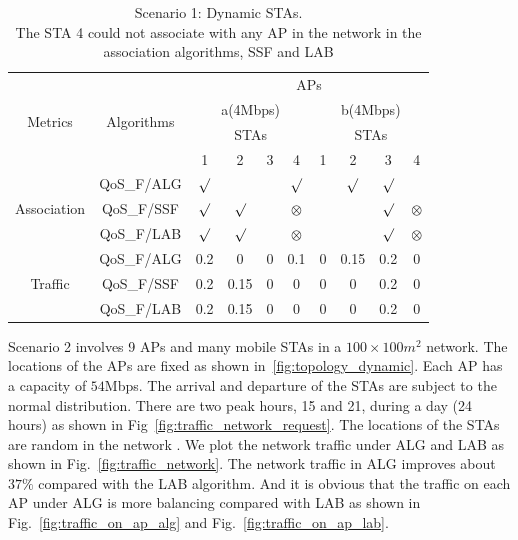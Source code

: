 \documentclass[conference]{IEEEtran}
\begin{document}
  \begin{table}[htbp]
  \centering
  \footnotesize
  \caption{Scenario 1: Dynamic STAs.\protect\\ The STA 4 could not associate with any AP in the network in the association algorithms, SSF and LAB }\label{tb:scenario_1}
    \begin{tabular}{|c|c|c|c|c|c|c|c|c|c|}
      \hline
      \multirow{4}{*}{Metrics}&\multirow{4}{*}{Algorithms}&\multicolumn{8}{|c|}{APs}\\
      \cline{3-10}
      &&\multicolumn{4}{|c|}{a(4Mbps)}&\multicolumn{4}{|c|}{b(4Mbps)}\\
      \cline{3-10}
      &&\multicolumn{4}{|c|}{STAs}&\multicolumn{4}{|c|}{STAs}\\
      \cline{3-10}
      &&1&2&3&4&1&2&3&4\\
      \hline
      \multirow{3}{*}{Association}
      &QoS\_F/ALG&$\surd$ &&&$\surd$&&$\surd$&$\surd$&\\
      \cline{2-10}
      &QoS\_F/SSF&$\surd$ &$\surd$&&$\otimes$&&&$\surd$&$\otimes$\\
      \cline{2-10}
      &QoS\_F/LAB&$\surd$ &$\surd$&&$\otimes$&&&$\surd$&$\otimes$\\

      \hline
      \multirow{3}{*}{Traffic}
      &QoS\_F/ALG&0.2&0&0&0.1&0&0.15&0.2&0\\
      \cline{2-10}
      &QoS\_F/SSF&0.2&0.15&0&0&0&0&0.2&0\\
      \cline{2-10}
      ($\times 10^3$ Mb)&QoS\_F/LAB&0.2&0.15&0&0&0&0&0.2&0\\

      \hline
    \end{tabular}

  \end{table}


  Scenario 2 involves 9 APs and many mobile STAs in a $100\times100m^2$ network.  The locations of the APs are fixed as shown in~\ref{fig:topology_dynamic}. Each AP has a capacity of $54$Mbps.  The arrival and departure of the STAs are subject to the normal distribution. There are two peak hours, 15 and 21, during a day (24 hours) as shown in Fig~\ref{fig:traffic_network_request}.  The locations of the STAs are random in the network .  We plot the network traffic under ALG and LAB as shown in Fig.~\ref{fig:traffic_network}.  The network traffic in ALG improves about $37\%$ compared with the LAB algorithm.  And it is obvious that the traffic on each AP under ALG is more balancing compared with LAB as shown in Fig.~\ref{fig:traffic_on_ap_alg} and Fig.~\ref{fig:traffic_on_ap_lab}.
\end{document}
